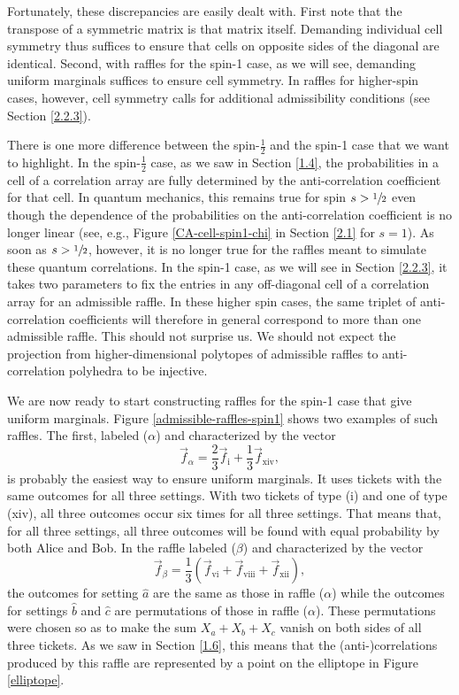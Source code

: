 Fortunately, these discrepancies are easily dealt with. First note that the transpose of a symmetric matrix is that matrix itself. Demanding individual cell symmetry thus suffices to ensure that cells on opposite sides of the diagonal are identical. Second, with raffles for the spin-1 case, as we will see, demanding uniform marginals suffices to ensure cell symmetry. In raffles for higher-spin cases, however, cell symmetry calls for additional admissibility conditions (see Section \ref{2.2.3}).

There is one more difference between the spin-$\frac12$ and the spin-1 case that we want to highlight. In the spin-$\frac12$ case, as we saw in Section \ref{1.4},  the probabilities in a cell of a correlation array are fully determined by the anti-correlation coefficient for that cell. In quantum mechanics, this remains true for spin $s > \sfrac12$ even though the dependence of the probabilities on the anti-correlation coefficient is no longer linear (see, e.g., Figure \ref{CA-cell-spin1-chi} in Section \ref{2.1} for $s=1$). As soon as $s > \sfrac12$, however, it is no longer true for the raffles meant to simulate these quantum correlations. In the spin-1 case, as we will see in Section \ref{2.2.3}, it takes two parameters to fix the entries in any off-diagonal cell of a correlation array for an admissible raffle. In these higher spin cases, the same triplet of anti-correlation coefficients will therefore in general correspond to more than one admissible raffle. This should not surprise us. We should not expect the projection from higher-dimensional polytopes of admissible raffles to anti-correlation polyhedra to be injective.    

We are now ready to start constructing raffles for the spin-1 case that give uniform marginals. Figure \ref{admissible-raffles-spin1} shows two examples of such raffles. The first, labeled ($\alpha$) and characterized by the vector 
\begin{equation}
\vec{f}_\alpha = \frac23 \vec{f}_{\mathrm{i}} + \frac13 \vec{f}_{\mathrm{xiv}},
\label{spin 1 raffle alpha}
\end{equation}
is probably the easiest way to ensure uniform marginals. It uses tickets with the same outcomes for all three settings. With two tickets of type (i) and one of type (xiv), all three outcomes occur six times for all three settings. That means that, for all three settings, all three outcomes will be found with equal probability by both Alice and Bob. In the raffle labeled ($\beta$) and characterized by the vector  
\begin{equation}
\vec{f}_\beta =  \frac13 \left( \vec{f}_{\mathrm{vi}} + \vec{f}_{\mathrm{viii}} + \vec{f}_{\mathrm{xii}}\right),
\label{spin 1 raffle beta}
\end{equation}
the outcomes for setting $\hat{a}$ are the same as those in raffle ($\alpha$) while the outcomes for settings $\hat{b}$ and $\hat{c}$ are permutations of those in raffle ($\alpha$). These permutations were chosen so as to make the sum $X_a + X_b + X_c$ vanish on both sides of all three tickets. As we saw in Section \ref{1.6}, this means that the (anti-)correlations produced by this raffle are represented by a point on the elliptope in Figure \ref{elliptope}. 

